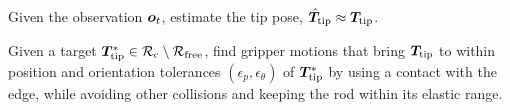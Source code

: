 \begin{problem}\label{prob:estimation}
Given the observation $\bm{o}_t$, estimate the tip pose, $\hat{\bm{T}}_{\mathrm{tip}}\approx\bm{T}_{\mathrm{tip}}$.
\end{problem}

\begin{problem}\label{prob:manipulation}
Given a target $\bm{T}^{*}_{\mathrm{tip}}\in\mathcal{R}_{\mathrm{c}}\setminus\mathcal{R}_{\mathrm{free}}$, find gripper motions that
bring $\bm{T}_{\mathrm{tip}}$ to within position and orientation tolerances
$(\epsilon_p,\epsilon_\theta)$ of $\bm{T}^{*}_{\mathrm{tip}}$ by using a contact with the
edge, while avoiding other collisions and keeping the rod within its elastic
range.
\end{problem}
